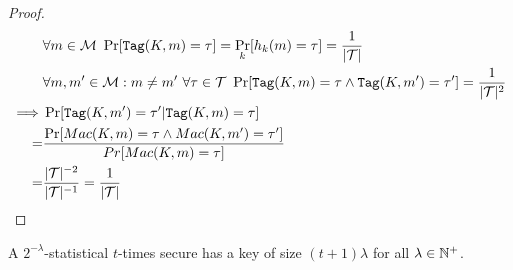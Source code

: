 \begin{proof}
    \begin{align*}
    	& \forall m \in \M \ \Pr[\Tag(K, m) \evaluatesto \tau] = \Pr_k[h_k(m) \evaluatesto \tau] = \frac{1}{|\Tau|} \\
    	& \forall m, m' \in \M : m \neq m' \ \forall \tau \in \Tau \ \Pr[\Tag(K, m) \evaluatesto \tau \wedge \Tag(K, m') \evaluatesto \tau'] = \frac{1}{|\Tau|^2} \\
        \implies & \Pr[\Tag(K, m') \evaluatesto \tau' | \Tag(K, m) \evaluatesto \tau] \\
        = & \frac{\Pr[Mac(K,m)=\tau \wedge Mac(K,m')=\tau']}{Pr[Mac(K,m)=\tau]} \\
        = & \frac{|\Tau|^{-2}}{|\Tau|^{-1}} = \frac{1}{|\Tau|}
    \end{align*}
\end{proof}

\begin{lemma}
    A $2^{-\lambda}$-statistical $t$-times secure \Mac{} has a key of size $(t+1) \lambda$ for all $\lambda \in \mathbb{N}^{+}$.
\end{lemma}